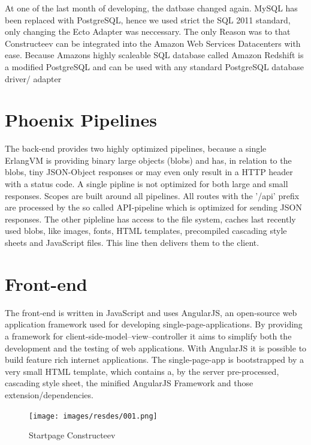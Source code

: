 \textcolor{newcode}{At one of the last month of developing, the datbase changed again. MySQL has been replaced with PostgreSQL, hence we used strict the SQL 2011 standard, only changing the Ecto Adapter was neccessary. The only Reason was to that Constructeev can be integrated into the Amazon Web Services Datacenters with ease. Because Amazons highly scaleable SQL database called Amazon Redshift is a modified PostgreSQL and can be used with any standard PostgreSQL database driver/ adapter}	

\section{Phoenix Pipelines}
The back-end provides two highly optimized pipelines, because a single ErlangVM is providing binary large objects (blobs) and has, in relation to the blobs, tiny JSON-Object responses or may even only result in a HTTP header with a status code. A single pipline is not optimized for both large and small responses. Scopes are built around all pipelines. All routes with the '/api' prefix are processed by the so called API-pipeline which is optimized for sending JSON responses. The other pipleline has access to the file system, caches last recently used blobs, like images, fonts, HTML templates, precompiled cascading style sheets and JavaScript files. This line then delivers them to the client. 

\section{Front-end}
The front-end is written in JavaScript and uses AngularJS, an open-source web application framework used for developing single-page-applications. By providing a framework for client-side-model–view–controller it aims to simplify both the development and the testing of web applications. With AngularJS it is possible to build feature rich internet applications. The single-page-app is bootstrapped by a very small HTML template, which contains a, by the server pre-processed, cascading style sheet, the minified AngularJS Framework and those extension/dependencies. 

\begin{figure}[H]
  \caption{Startpage Constructeev}
  \centering
    \texttt{[image: images/resdes/001.png]}
\end{figure}


